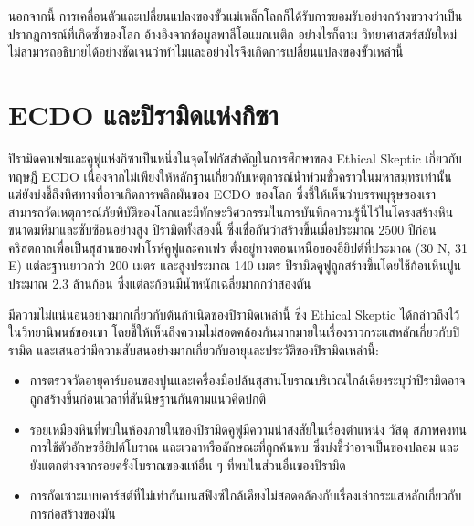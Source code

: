 \documentclass[10pt,twocolumn,letterpaper]{article}
\begin{document}
นอกจากนี้ การเคลื่อนตัวและเปลี่ยนแปลงของขั้วแม่เหล็กโลกก็ได้รับการยอมรับอย่างกว้างขวางว่าเป็นปรากฏการณ์ที่เกิดซ้ำของโลก อ้างอิงจากข้อมูลพาลีโอแมกเนติก \cite{35,40,41} อย่างไรก็ตาม วิทยาศาสตร์สมัยใหม่ไม่สามารถอธิบายได้อย่างชัดเจนว่าทำไมและอย่างไรจึงเกิดการเปลี่ยนแปลงของขั้วเหล่านี้

\section{ECDO และปิรามิดแห่งกิซา}

ปิรามิดคาเฟรและคูฟูแห่งกิซาเป็นหนึ่งในจุดโฟกัสสำคัญในการศึกษาของ Ethical Skeptic เกี่ยวกับทฤษฎี ECDO \cite{27} เนื่องจากไม่เพียงให้หลักฐานเกี่ยวกับเหตุการณ์น้ำท่วมชั่วคราวในมหาสมุทรเท่านั้น แต่ยังบ่งชี้ถึงทิศทางที่อาจเกิดการพลิกผันของ ECDO ของโลก ซึ่งชี้ให้เห็นว่าบรรพบุรุษของเราสามารถวัดเหตุการณ์ภัยพิบัติของโลกและมีทักษะวิศวกรรมในการบันทึกความรู้นี้ไว้ในโครงสร้างหินขนาดมหึมาและซับซ้อนอย่างสูง ปิรามิดทั้งสองนี้ ซึ่งเชื่อกันว่าสร้างขึ้นเมื่อประมาณ 2500 ปีก่อนคริสตกาลเพื่อเป็นสุสานของฟาโรห์คูฟูและคาเฟร ตั้งอยู่ทางตอนเหนือของอียิปต์ที่ประมาณ (30 N, 31 E) แต่ละฐานยาวกว่า 200 เมตร และสูงประมาณ 140 เมตร ปิรามิดคูฟูถูกสร้างขึ้นโดยใช้ก้อนหินปูนประมาณ 2.3 ล้านก้อน ซึ่งแต่ละก้อนมีน้ำหนักเฉลี่ยมากกว่าสองตัน \cite{24, 25}

มีความไม่แน่นอนอย่างมากเกี่ยวกับต้นกำเนิดของปิรามิดเหล่านี้ ซึ่ง Ethical Skeptic ได้กล่าวถึงไว้ในวิทยานิพนธ์ของเขา โดยชี้ให้เห็นถึงความไม่สอดคล้องกันมากมายในเรื่องราวกระแสหลักเกี่ยวกับปิรามิด และเสนอว่ามีความสับสนอย่างมากเกี่ยวกับอายุและประวัติของปิรามิดเหล่านี้:

\begin{flushleft}
\begin{itemize}
    \item การตรวจวัดอายุคาร์บอนของปูนและเครื่องมือปล้นสุสานโบราณบริเวณใกล้เคียงระบุว่าปิรามิดอาจถูกสร้างขึ้นก่อนเวลาที่สันนิษฐานกันตามแนวคิดปกติ
    \item รอยเหมืองหินที่พบในห้องภายในของปิรามิดคูฟูมีความน่าสงสัยในเรื่องตำแหน่ง วัสดุ สภาพคงทน การใช้ตัวอักษรอียิปต์โบราณ และเวลาหรือลักษณะที่ถูกค้นพบ ซึ่งบ่งชี้ว่าอาจเป็นของปลอม และยังแตกต่างจากรอยครั่งโบราณของแท้อื่น ๆ ที่พบในส่วนอื่นของปิรามิด
    \item การกัดเซาะแบบคาร์สต์ที่ไม่เท่ากันบนสฟิงซ์ใกล้เคียงไม่สอดคล้องกับเรื่องเล่ากระแสหลักเกี่ยวกับการก่อสร้างของมัน
\end{itemize}
\end{flushleft}
\end{document}
